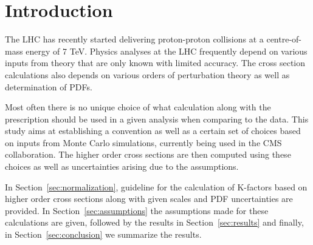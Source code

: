 \section{Introduction}
\label{sec:intro}
The LHC has recently started delivering proton-proton collisions at a 
centre-of-mass energy of 7 TeV. Physics analyses at the LHC frequently depend 
on various inputs from theory that are only known with limited accuracy. The 
cross section calculations also depends on various orders of perturbation 
theory as well as determination of PDFs. 

Most often there is no unique choice of what calculation along with the 
prescription should be used in a given analysis when comparing to the data. 
This study aims at establishing a convention as well as a certain set of 
choices based on inputs from Monte Carlo simulations, currently being used in 
the CMS collaboration. The higher order cross sections are then computed using 
these choices as well as uncertainties arising due to the assumptions.

In Section~\ref{sec:normalization}, guideline for the calculation of K-factors 
based on higher order cross sections along with given scales and PDF 
uncertainties are provided. In Section~\ref{sec:assumptions} the assumptions 
made for these calculations are given, followed by the results in 
Section~\ref{sec:results} and finally, in Section~\ref{sec:conclusion} we 
summarize the results.
